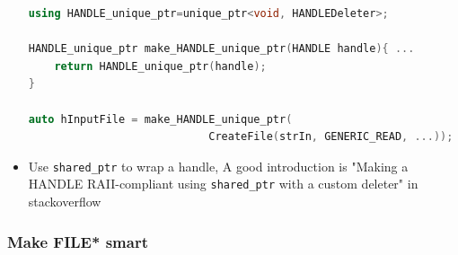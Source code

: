\documentclass[a4paper,11pt,twoside]{book}
\begin{document}
\begin{itemize}
\begin{lstlisting}[frame=single, language=c++]
using HANDLE_unique_ptr=unique_ptr<void, HANDLEDeleter>;
	
HANDLE_unique_ptr make_HANDLE_unique_ptr(HANDLE handle){ ...
	return HANDLE_unique_ptr(handle);
}
	
auto hInputFile = make_HANDLE_unique_ptr(
                            CreateFile(strIn, GENERIC_READ, ...));
\end{lstlisting}
	
	\item Use \texttt{shared\_ptr} to wrap a handle, A good introduction is "Making a HANDLE RAII-compliant using \texttt{shared\_ptr} with a custom deleter" in stackoverflow
\end{itemize}	

\subsubsection{Make FILE* smart}
\end{document}
